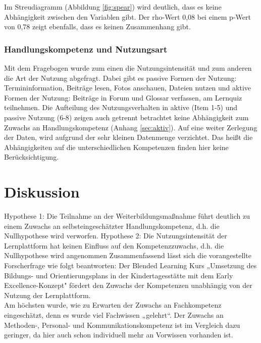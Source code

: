 \documentclass[12pt, bibliography=totoc]{scrartcl}
\begin{document}
Im Streudiagramm (Abbildung \ref{fig:spear}) wird deutlich, dass es
keine Abhängigkeit zwischen den Variablen gibt. Der rho-Wert 0,08 bei
einem p-Wert von 0,78 zeigt ebenfalls, dass es keinen Zusammenhang gibt.

\subsubsection{Handlungskompetenz und
Nutzungsart}\label{handlungskompetenz-und-nutzungsart}

Mit dem Fragebogen wurde zum einen die Nutzungsintensität und zum
anderen die Art der Nutzung abgefragt. Dabei gibt es passive Formen der
Nutzung: Termininformation, Beiträge lesen, Fotos anschauen, Dateien
nutzen und aktive Formen der Nutzung: Beiträge in Forum und Glossar
verfassen, am Lernquiz teilnehmen. Die Aufteilung des Nutzungsverhalten
in aktive (Item 1-5) und passive Nutzung (6-8) zeigen auch getrennt
betrachtet keine Abhängigkeit zum Zuwachs an Handlungskompetenz (Anhang
\ref{sec:aktiv}). Auf eine weiter Zerlegung der Daten, wird aufgrund der
sehr kleinen Datenmenge verzichtet. Das heißt die Abhängigkeiten auf die
unterschiedlichen Kompetenzen finden hier keine Berücksichtigung.

\section{Diskussion}\label{diskussion}

Hypothese 1: Die Teilnahme an der Weiterbildungsmaßnahme führt deutlich
zu einem Zuwachs an selbsteingeschätzter Handlungskompetenz, d.h. die
Nullhypothese wird verworfen. Hypothese 2: Die Nutzungsintensität der
Lernplattform hat keinen Einfluss auf den Kompetenzzuwachs, d.h. die
Nullhypothese wird angenommen Zusammenfassend lässt sich die
vorangestellte Forscherfrage wie folgt beantworten: Der Blended Learning
Kurs „Umsetzung des Bildungs- und Orientierungsplans in der
Kindertagesstätte mit dem Early Excellence-Konzept" fördert den Zuwachs
der Kompetenzen unabhängig von der Nutzung der Lernplattform.\\
Am höchsten wurde, wie zu Erwarten der Zuwachs an Fachkompetenz
eingeschätzt, denn es wurde viel Fachwissen „gelehrt``. Der Zuwachs an
Methoden-, Personal- und Kommunikationskompetenz ist im Vergleich dazu
geringer, da hier auch schon individuell mehr an Vorwissen vorhanden
ist.
\end{document}
